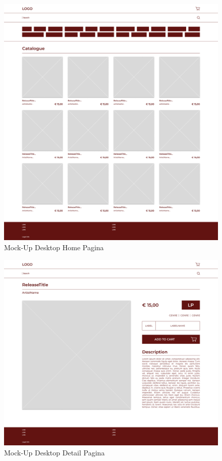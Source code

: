 \begin{figure}
	\centering
	\includegraphics[width=1\linewidth]{graphics/HomePageDesktop}
	\caption[Mock-Up Desktop]{Mock-Up Desktop Home Pagina}
	\label{fig:desktopHomeMockUp}
\end{figure}

\begin{figure}
	\centering
	\includegraphics[width=1\linewidth]{graphics/DetailPageDesktop}
	\caption[Mock-Up Desktop]{Mock-Up Desktop Detail Pagina}
	\label{fig:desktopDetailMockUp}
\end{figure}

